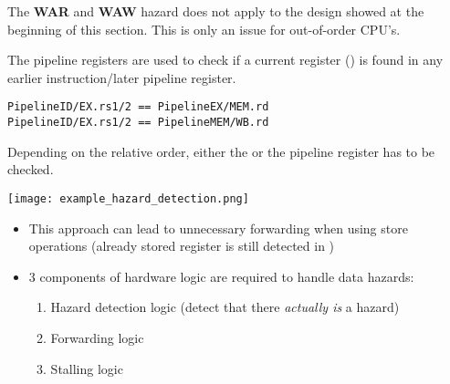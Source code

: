 The \textbf{WAR} and \textbf{WAW} hazard does not apply to the design showed at the beginning of this section. This is only an issue for out-of-order CPU's.

\newpar{}

The pipeline registers are used to check if a current  register () is found in any earlier instruction/later pipeline register.
\begin{lstlisting}
PipelineID/EX.rs1/2 == PipelineEX/MEM.rd
PipelineID/EX.rs1/2 == PipelineMEM/WB.rd
\end{lstlisting}

\newpar{}
Depending on the relative order, either the  or the  pipeline register has to be checked.

\begin{center}
    \texttt{[image: example\_hazard\_detection.png]}
\end{center}

\newpar{}
\begin{itemize}
    \item This approach can lead to unnecessary forwarding when using store operations (already stored register is still detected in ) %
    \item 3 components of hardware logic are required to handle data hazards:
          \begin{enumerate}
              \item Hazard detection logic (detect that there \textit{actually is} a hazard)
              \item Forwarding logic
              \item Stalling logic
          \end{enumerate}
\end{itemize}


    
